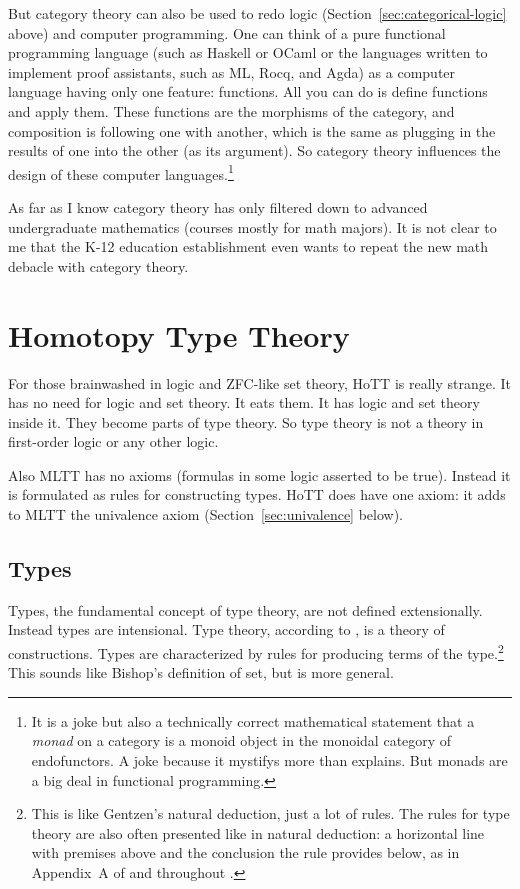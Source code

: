 \documentclass[11pt]{article}
\begin{document}
But category theory can also be used to redo logic
(Section~\ref{sec:categorical-logic} above)
and computer programming.  One can think of a pure functional programming
language (such as Haskell or OCaml or the languages written to implement
proof assistants, such as ML, Rocq, and Agda) as a computer language having
only one feature: functions.  All you can do is define functions and apply
them.  These functions are the morphisms of the category, and composition
is following one with another, which is the same as plugging in the results
of one into the other (as its argument).  So category theory influences the
design of these computer languages.\footnote{It is a joke but also a
technically correct mathematical statement that a \emph{monad}
on a category is a monoid object in the monoidal category of endofunctors.
A joke because it mystifys more than explains.  But monads are a big deal
in functional programming.}

As far as I know category theory has only filtered down to advanced
undergraduate mathematics (courses mostly for math majors).  It is not
clear to me that the K-12 education establishment even wants to repeat
the new math debacle with category theory.

\section{Homotopy Type Theory}

For those brainwashed in logic and ZFC-like set theory, HoTT is really strange.
It has no need for logic and set theory.  It eats them.  It has logic
and set theory inside it.  They become parts of type theory.
So type theory is not a theory in first-order logic or any other logic.

Also MLTT has no axioms (formulas in some logic asserted to be true).
Instead it is formulated as rules for constructing types.
HoTT does have one axiom: it adds to MLTT the univalence axiom
(Section~\ref{sec:univalence} below).

\subsection{Types}

Types, the fundamental concept of type theory, are not defined
extensionally.
Instead types are intensional.  Type theory, according to
\citet[near the beginning of the first lecture]{bauer-hott},
is a theory of constructions.  Types are characterized by
rules for producing terms of the type.\footnote{This is like Gentzen's
natural deduction, just a lot of rules.  The rules for type theory
are also often presented like in natural deduction: a horizontal line
with premises above and the conclusion the rule provides below,
as in Appendix~A of  and throughout \citet{rijke}.}
This sounds like Bishop's definition of set, but is more general.
\end{document}
